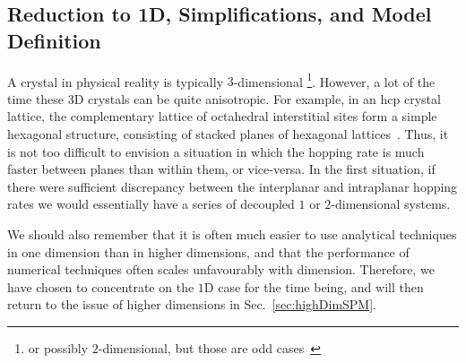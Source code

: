 \subsection{Reduction to 1D, Simplifications, and Model Definition}
\label{sec:modelDefn}
A crystal in physical reality is typically $3$-dimensional 
\footnote{or possibly $2$-dimensional, but those
are odd cases~\cite{allen2009}}.
However, a lot of the time these $3$D crystals can be quite anisotropic. For example, in
an hcp crystal lattice, the complementary lattice of octahedral interstitial sites form a simple hexagonal
structure, consisting of stacked planes of hexagonal lattices~\cite{Li2018}. Thus, it is not too difficult to envision
a situation in which the hopping rate is much faster between planes than within them, or vice-versa. In the
first situation, if there were sufficient discrepancy between the interplanar and intraplanar hopping rates
we would essentially have a series of decoupled $1$ or $2$-dimensional systems.

We should also remember that it is often much easier to use analytical techniques in one dimension than
in higher dimensions, and that the performance of numerical techniques often scales unfavourably 
with dimension. Therefore, we have chosen to concentrate on the $1$D case for the time being, and will then
return to the issue of higher dimensions in Sec.~\ref{sec:highDimSPM}.

